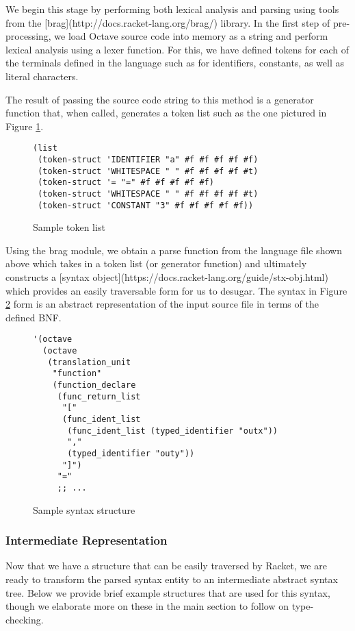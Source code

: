 We begin this stage by performing both lexical analysis and parsing using tools from the [brag](http://docs.racket-lang.org/brag/) library. In the first step of pre-processing, we load Octave source code into memory as a string and perform lexical analysis using a lexer function. For this, we have defined tokens for each of the terminals defined in the language such as for identifiers, constants, as well as literal characters.

The result of passing the source code string to this method is a generator function that, when called, generates a token list such as the one pictured in Figure \ref{fig:token}.

\begin{figure}[h]
    \begin{lstlisting}[language=racket]
(list
 (token-struct 'IDENTIFIER "a" #f #f #f #f #f)
 (token-struct 'WHITESPACE " " #f #f #f #f #t)
 (token-struct '= "=" #f #f #f #f #f)
 (token-struct 'WHITESPACE " " #f #f #f #f #t)
 (token-struct 'CONSTANT "3" #f #f #f #f #f))
    \end{lstlisting}
    \caption[]{Sample token list}
    \label{fig:token}
\end{figure}

Using the brag module, we obtain a parse function from the language file shown above which takes in a token list (or generator function) and ultimately constructs a [syntax object](https://docs.racket-lang.org/guide/stx-obj.html) which provides an easily traversable form for us to desugar. The syntax in Figure \ref{fig:syntax} form is an abstract representation of the input source file in terms of the defined BNF. 

\begin{figure}[h]
    \begin{lstlisting}[language=racket]
'(octave
  (octave
   (translation_unit
    "function"
    (function_declare
     (func_return_list
      "["
      (func_ident_list
       (func_ident_list (typed_identifier "outx"))
       ","
       (typed_identifier "outy"))
      "]")
     "="
     ;; ...
    \end{lstlisting}
    \caption[]{Sample syntax structure}
    \label{fig:syntax}
\end{figure}

\subsubsection{Intermediate Representation}
Now that we have a structure that can be easily traversed by Racket, we are ready to transform the parsed syntax entity to an intermediate abstract syntax tree. Below we provide brief example structures that are used for this syntax, though we elaborate more on these in the main section to follow on type-checking.

